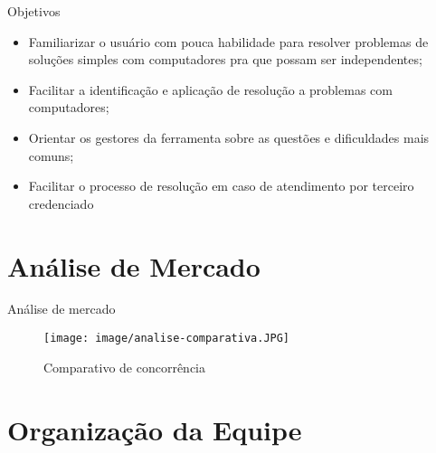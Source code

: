 \documentclass[%
    english,
    brazil]{ifsp-spo-beamer}
\begin{document}
\begin{frame}{Objetivos} 
    \begin{itemize}
			
		\item
		Familiarizar o usuário com pouca habilidade para resolver problemas de soluções simples com computadores pra que possam ser independentes;
		
		\item
		Facilitar a identificação e aplicação de resolução a problemas com computadores;
		
		\item
		Orientar os gestores da ferramenta sobre as questões e dificuldades mais comuns;
		
		\item 
		Facilitar o processo de resolução em caso de atendimento por terceiro credenciado
		
	\end{itemize}
\end{frame}

\section{Análise de Mercado}

    \begin{frame}{Análise de mercado}
    
        \begin{table} \centering
            \begin{figure}
                    \centering
                	\caption{\label{analise}Comparativo de concorrência}
                	\texttt{[image: image/analise-comparativa.JPG]}
            \end{figure}
        \end{table}
    \end{frame}
    
\section{Organização da Equipe}
\end{document}
